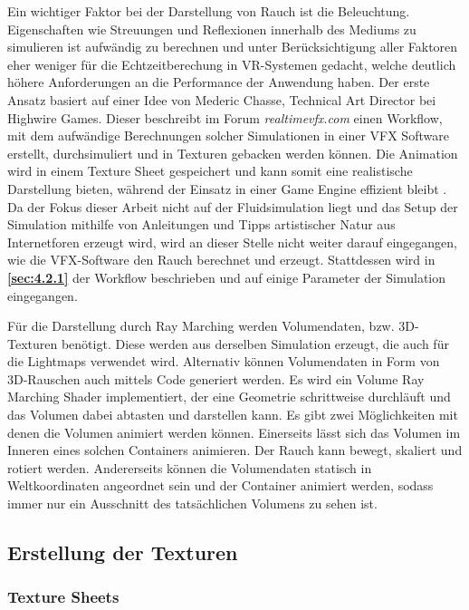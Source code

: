 Ein wichtiger Faktor bei der Darstellung von Rauch ist die Beleuchtung. Eigenschaften wie Streuungen und Reflexionen innerhalb des Mediums zu simulieren ist
aufwändig zu berechnen und unter Berücksichtigung aller Faktoren eher weniger für die Echtzeitberechung in VR-Systemen gedacht, welche deutlich höhere Anforderungen an die Performance der Anwendung
haben. Der erste Ansatz basiert auf einer Idee von Mederic Chasse, Technical Art Director  bei Highwire Games.
Dieser beschreibt im Forum \textit{realtimevfx.com} einen Workflow, mit dem aufwändige Berechnungen solcher Simulationen in einer VFX Software erstellt, durchsimuliert und in Texturen gebacken
werden können.
Die Animation wird in einem Texture Sheet gespeichert und kann somit eine realistische Darstellung bieten, während der Einsatz in einer Game Engine effizient bleibt \parencite{Chasse2018}.
Da der Fokus dieser Arbeit nicht auf der Fluidsimulation liegt und das Setup der Simulation mithilfe von Anleitungen
und Tipps artistischer Natur aus Internetforen erzeugt wird, wird an dieser Stelle nicht weiter darauf eingegangen, wie die VFX-Software den Rauch berechnet und erzeugt.
Stattdessen wird in \textbf{\autoref{sec:4.2.1}} der Workflow beschrieben und auf einige Parameter der Simulation eingegangen.

Für die Darstellung durch Ray Marching werden Volumendaten, bzw. 3D-Texturen benötigt. Diese werden aus derselben Simulation erzeugt, die auch für die Lightmaps verwendet wird.
Alternativ können Volumendaten in Form von 3D-Rauschen auch mittels Code generiert werden.
Es wird ein Volume Ray Marching Shader implementiert, der eine Geometrie schrittweise durchläuft und das Volumen dabei abtasten und darstellen kann.
Es gibt zwei Möglichkeiten mit denen die Volumen animiert werden können. Einerseits lässt sich das Volumen im Inneren eines solchen Containers animieren.
Der Rauch kann bewegt, skaliert und rotiert werden. Andererseits können die Volumendaten statisch in Weltkoordinaten angeordnet sein und der Container
animiert werden, sodass immer nur ein Ausschnitt des tatsächlichen Volumens zu sehen ist.


\subsection{Erstellung der Texturen}
\label{sec:4.2}


\subsubsection{Texture Sheets}
\label{sec:4.2.1}

